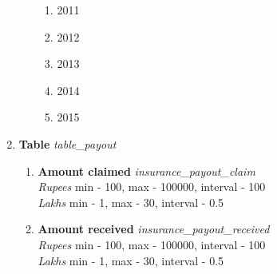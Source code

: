 \documentclass{article}
\begin{document}
\begin{enumerate}
\begin{enumerate}[label*=\arabic*.]
\begin{enumerate}
\item 2011
\item 2012
\item 2013
\item 2014
\item 2015
\end{enumerate}
\end{enumerate}
\item {\bfseries Table}\emph{ table\_payout }
\begin{enumerate}[label*=\arabic*.]
\item {\bfseries Amount claimed}\emph{ insurance\_payout\_claim }
\\ \emph{ Rupees }min - 100, max - 100000, interval - 100
\\ \emph{ Lakhs }min - 1, max - 30, interval - 0.5

\item {\bfseries Amount received}\emph{ insurance\_payout\_received }
\\ \emph{ Rupees }min - 100, max - 100000, interval - 100
\\ \emph{ Lakhs }min - 1, max - 30, interval - 0.5


\end{enumerate}
\end{enumerate}
\end{document}
